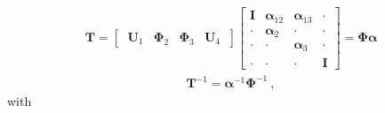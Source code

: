 \documentclass[letterpaper,10pt,english]{jupyterBook}
\begin{document}
\sphinxAtStartPar
{}
\begin{equation*}
\begin{split}
\mathbf{T} = \begin{bmatrix} \ \mathbf{U}_1 & \boldsymbol\Phi_2 & \boldsymbol\Phi_3 & \mathbf{U}_4 \ \end{bmatrix}
\begin{bmatrix}
  \mathbf{I} & \boldsymbol\alpha_{12} & \boldsymbol\alpha_{13} & \cdot \\
  \cdot      & \boldsymbol\alpha_{2 } & \cdot                  & \cdot \\
  \cdot      & \cdot                  & \boldsymbol\alpha_{3 } & \cdot \\
  \cdot      & \cdot                  & \cdot                  & \mathbf{I}
\end{bmatrix} =
\boldsymbol\Phi \boldsymbol\alpha
\end{split}
\end{equation*}
\sphinxAtStartPar
{}
\begin{equation*}
\begin{split}\mathbf{T}^{-1} = \boldsymbol\alpha^{-1} \boldsymbol\Phi^{-1} \ ,\end{split}
\end{equation*}
\sphinxAtStartPar
with
\end{document}
